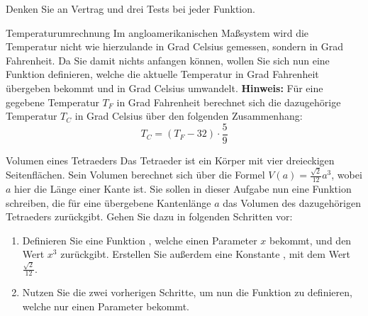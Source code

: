 \documentclass{../preamble}
\date{14.12.2020 - 18.12.2020}
\begin{document}
	
	\maketitle
	
	\makedisclaimer
	
	\clearpage
	
	\setcounter{task}{1}
	
	\begin{tcolorbox}
	    Denken Sie an Vertrag und drei Tests bei jeder Funktion.
	\end{tcolorbox}
	
	\begin{task}[credit = \stars{0}{3}]{Temperaturumrechnung}
	    Im angloamerikanischen Maßsystem wird die Temperatur nicht wie hierzulande in Grad Celsius gemessen, sondern in Grad Fahrenheit. Da Sie damit nichts anfangen können, wollen Sie sich nun eine Funktion  definieren, welche die aktuelle Temperatur in Grad Fahrenheit übergeben bekommt und in Grad Celsius umwandelt.
	    \br
	    \textbf{Hinweis:} Für eine gegebene Temperatur \(T_F\) in Grad Fahrenheit berechnet sich die dazugehörige Temperatur \(T_C\) in Grad Celsius über den folgenden Zusammenhang:
	    \begin{equation*}
	        T_C = (T_F - 32) \cdot \frac{5}{9}
	    \end{equation*}
	
	    \begin{solution}
	        
	    \end{solution}
	\end{task}
	
	\clearpage
	
	\begin{task}[credit = \stars{1}{3}]{Volumen eines Tetraeders}
	    Das Tetraeder ist ein Körper mit vier dreieckigen Seitenflächen. Sein Volumen berechnet sich über die Formel \(V(a) = \frac{\sqrt{2}}{12} a^3\), wobei \(a\) hier die Länge einer Kante ist. Sie sollen in dieser Aufgabe nun eine Funktion  schreiben, die für eine übergebene Kantenlänge \(a\) das Volumen des dazugehörigen Tetraeders zurückgibt. Gehen Sie dazu in folgenden Schritten vor:
	    \begin{enumerate}
	        \item Definieren Sie eine Funktion , welche einen Parameter \(x\) bekommt, und den Wert \(x^3\) zurückgibt. Erstellen Sie außerdem eine Konstante , mit dem Wert \(\frac{\sqrt{2}}{12}\).
	        \item Nutzen Sie die zwei vorherigen Schritte, um nun die Funktion  zu definieren, welche nur einen Parameter  bekommt.
	    \end{enumerate}
	
	    \begin{solution}
	        
	    \end{solution}
	\end{task}
	
\end{document}
